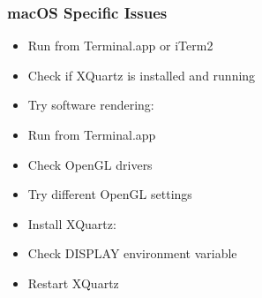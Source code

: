 \documentclass[a4paper,10pt,english,openany,oneside]{sphinxmanual}
\begin{document}
\subsubsection{macOS Specific Issues}
\label{\detokenize{legacy_examples:macos-specific-issues}}\begin{description}
\begin{itemize}
\item {} 
\sphinxAtStartPar
Run from Terminal.app or iTerm2

\item {} 
\sphinxAtStartPar
Check if XQuartz is installed and running

\item {} 
\sphinxAtStartPar
Try software rendering: 

\end{itemize}

\begin{itemize}
\item {} 
\sphinxAtStartPar
Run from Terminal.app

\item {} 
\sphinxAtStartPar
Check OpenGL drivers

\item {} 
\sphinxAtStartPar
Try different OpenGL settings

\end{itemize}

\begin{itemize}
\item {} 
\sphinxAtStartPar
Install XQuartz: 

\item {} 
\sphinxAtStartPar
Check DISPLAY environment variable

\item {} 
\sphinxAtStartPar
Restart XQuartz

\end{itemize}

\end{description}
\end{document}
